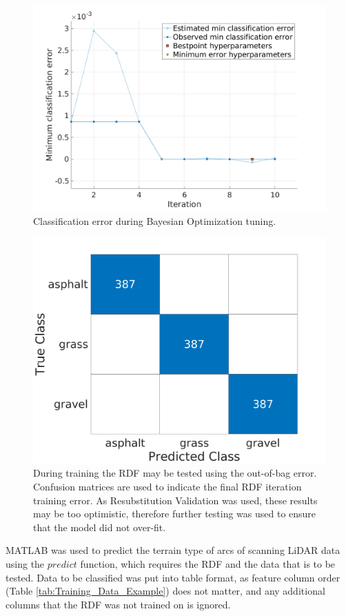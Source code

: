 \documentclass[numbered,pdftex]{ohio-etd}
\begin{document}
{{		\begin{figure}[H]
			\centering
			\includegraphics[width=0.5\linewidth]{Defense_Images/c2_bayesian_range}
			\caption[Bayesian Optimization - RANGE]{Classification error during Bayesian Optimization tuning.}
			\label{fig:c2_min_class_error}
		\end{figure}				
		
		\begin{figure}[H]
			\centering
			\includegraphics[width=0.65\linewidth]{Defense_Images/chan_2c_conf_OOB_mat222}
			\caption[Out-of-Bag Error]{During training the RDF may be tested using the out-of-bag error. Confusion matrices are used to indicate the final RDF iteration training error. As Resubstitution Validation was used, these results may be too optimistic, therefore further testing was used to ensure that the model did not over-fit.}
			\label{fig:out_of_bag_err_conf_mat}
		\end{figure}
		
		{MATLAB was used to predict the terrain type of arcs of scanning LiDAR data using the $predict$ function, which requires the RDF and the data that is to be tested. Data to be classified was put into table format, as feature column order (Table \ref{tab:Training_Data_Example}) does not matter, and any additional columns that the RDF was not trained on is ignored.}
		
}}
\end{document}

